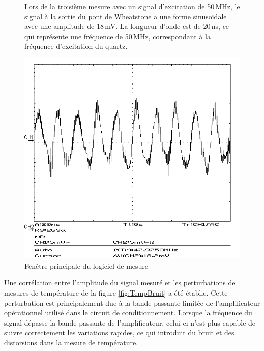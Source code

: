 \begin{figure}[H]
    \centering
    \begin{minipage}{0.48\textwidth}
        \small
        Lors de la troisième mesure avec un signal d'excitation de 50\,MHz, le signal à la sortie du pont de Wheatstone a une forme sinusoïdale avec une amplitude de 18\,mV.
        La longueur d'onde est de 20\,ns, ce qui représente une fréquence de 50\,MHz, correspondant à la fréquence d'excitation du quartz.
    \end{minipage}\hfill
    \begin{minipage}{0.48\textwidth}
        \centering
        \includegraphics[width=\textwidth]{assets/figures/SCR00008.png}
        \caption{Fenêtre principale du logiciel de mesure}
        \label{fig:50mhzbruit}
    \end{minipage}
\end{figure}

Une corrélation entre l'amplitude du signal mesuré et les perturbations de mesures de température de la figure \ref{fig:TempBruit} a été établie.
Cette perturbation est principalement due à la bande passante limitée de l'amplificateur opérationnel utilisé dans le circuit de conditionnement. Lorsque la fréquence du signal dépasse la bande passante de l'amplificateur, celui-ci n'est plus capable de suivre correctement les variations rapides, ce qui introduit du bruit et des distorsions dans la mesure de température.

